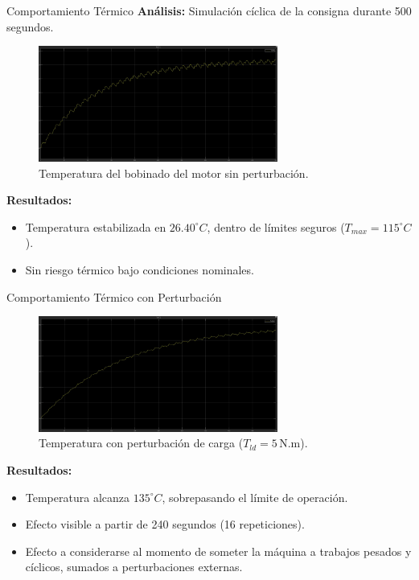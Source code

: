 \documentclass[12pt]{beamer}
\begin{document}
\begin{frame}{Comportamiento Térmico}
\textbf{Análisis:} Simulación cíclica de la consigna durante 500 segundos.

\begin{figure}[h]
    \centering
    \includegraphics[width=0.7\textwidth]{Imagenes/verificacion_temperatura.jpeg}
    \caption{Temperatura del bobinado del motor sin perturbación.}
    \label{fig:temperatura_sin_perturbacion}
\end{figure}

\textbf{Resultados:}
\begin{itemize}
    \item Temperatura estabilizada en \(26.40^\circ C\), dentro de límites seguros (\(T_{max} = 115^\circ C\)).
    \item Sin riesgo térmico bajo condiciones nominales.
\end{itemize}
\end{frame}

\begin{frame}{Comportamiento Térmico con Perturbación}
\begin{figure}[h]
    \centering
    \includegraphics[width=0.7\textwidth]{Imagenes/verificacion_temperatura_carga.jpeg}
    \caption{Temperatura con perturbación de carga (\(T_{ld} = 5 \, \text{N.m}\)).}
    \label{fig:temperatura_con_perturbacion}
\end{figure}

\textbf{Resultados:}
\begin{itemize}\small
    \item Temperatura alcanza \(135^\circ C\), sobrepasando el límite de operación.
    \item Efecto visible a partir de 240 segundos (16 repeticiones).
    \item Efecto a considerarse al momento de someter la máquina a trabajos pesados y cíclicos, sumados a perturbaciones externas.
\end{itemize}
\end{frame}
\end{document}
